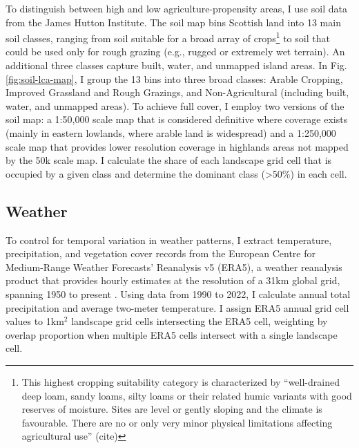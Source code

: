 To distinguish between high and low agriculture-propensity areas, I use soil data from the James Hutton Institute. The soil map bins Scottish land into 13 main soil classes, ranging from soil suitable for a broad array of crops\footnote{This highest cropping suitability category is characterized by ``well-drained deep loam, sandy loams, silty loams or their related humic variants with good reserves of moisture. Sites are level or gently sloping and the climate is favourable. There are no or only very minor physical limitations affecting agricultural use'' (cite)} to soil that could be used only for rough grazing (e.g., rugged or extremely wet terrain). An additional three classes capture built, water, and unmapped island areas. In Fig. \ref{fig:soil-lca-map}, I group the 13 bins into three broad classes: Arable Cropping, Improved Grassland and Rough Grazings, and Non-Agricultural (including built, water, and unmapped areas). To achieve full cover, I employ two versions of the soil map: a 1:50,000 scale map that is considered definitive where coverage exists (mainly in eastern lowlands, where arable land is widespread) and a 1:250,000 scale map that provides lower resolution coverage in highlands areas not mapped by the 50k scale map. I calculate the share of each landscape grid cell that is occupied by a given class and determine the dominant class (>50\%) in each cell.

\subsection{Weather}

To control for temporal variation in weather patterns, I extract temperature, precipitation, and vegetation cover records from the European Centre for Medium-Range Weather Forecasts' Reanalysis v5 (ERA5), a weather reanalysis product that provides hourly estimates at the resolution of a 31km global grid, spanning 1950 to present \citep{hersbach_era5_2020}. Using data from 1990 to 2022, I calculate annual total precipitation and average two-meter temperature. I assign ERA5 annual grid cell values to 1km$^2$ landscape grid cells intersecting the ERA5 cell, weighting by overlap proportion when multiple ERA5 cells intersect with a single landscape cell.

